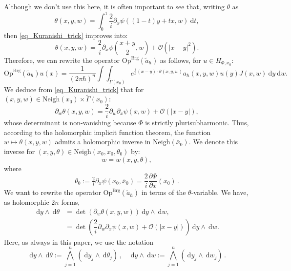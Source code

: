 \documentclass{article}
\newcommand{\Vois}{\mathrm{Neigh}}
\newcommand{\Op}{\mathrm{Op}}
\newcommand{\Brg}{\mathrm{Brg}}
\newcommand{\DD}{\:\!\mathrm{d}}
\newcommand{\intint}{\int\!\!\!\!\int}
\newcommand{\h}{\hbar}
\begin{document}
Although we don't use this here, it is often important to see that,
writing $ \theta$ as
\[
\theta(x, y, w) = \int_0^1 \dfrac{2}{i} \partial_x \psi((1-t)y+ tx, w)
\DD t ,
\]
then \eqref{eq_Kuranishi_trick} improves into:
\[
\theta(x, y, w) = \dfrac{2}{i} \partial_x \psi \left( \dfrac{x+y}{2},
  w \right) + \mathcal{O}( |x-y|^2).
\]
Therefore, we can rewrite the operator
$ \Op^{\Brg}(\tilde a_{ \hbar})$ as follows, for
$u \in H_{ \Phi, x_0}$:
\[
\Op^{\Brg}(\tilde a_{ \hbar}) u(x) = \dfrac{1}{( 2 \pi \hbar)^{n}}
\intint_{\tilde{\Gamma}(x_0)} e^{\frac{i}{\h} (x-y)\cdot\theta(x, y,
  w)} a_{ \hbar}(x, y, w) u(y) J(x, w) \DD y \DD w.
\]
We deduce from \eqref{eq_Kuranishi_trick} that for
$(x, y, w) \in \Vois(x_0) \times \tilde{\Gamma}(x_0)$:
\begin{equation}
  \label{equ:kuranishi-derive}
  \partial_w \theta(x, y, w) =
  \dfrac{2}{i} \partial_w \partial_x \psi(x, w) + \mathcal{O}(|x-y|),
\end{equation}
whose determinant is non-vanishing because $ \Phi$ is strictly
plurisubharmonic. Thus, according to the holomorphic implicit function
theorem, the function $w \mapsto \theta(x, y, w)$ admits a holomorphic
inverse in $ \Vois(\bar{x}_0)$. We denote this inverse for
$(x, y, \theta) \in \Vois(x_0, x_0, \theta_0)$ by:
\begin{equation} \label{eqref:w(x,y,theta)} w = w(x, y, \theta) ,
\end{equation}
where
\[
\theta_0 := \tfrac{2}{i} \partial_x \psi(x_0, \bar{x}_0) =
\dfrac{2}{i} \dfrac{\partial \Phi}{\partial x}(x_0)\,.
\]
We want to rewrite the operator $ \Op^{\Brg}(\tilde a_{ \hbar})$ in
terms of the $ \theta$-variable. We have, as holomorphic $2n$-forms,
\begin{align}
  \DD y \wedge \DD \theta 
  & = \det  \left( \partial_w \theta(x, y, w) \right) \DD y \wedge \DD w, \\
  & = \det \left( \dfrac{2}{i} \partial_w \partial_x \psi(x, w) + \mathcal{O}(|x-y|) \right) \DD y \wedge \DD w .
\end{align}
Here, as always in this paper, we use the notation
\[
\DD y \wedge \DD \theta := \bigwedge_{j=1}^n (\DD y_j \wedge \DD
\theta_j)\,, \quad \DD y \wedge \DD w := \bigwedge_{j=1}^n (\DD y_j
\wedge \DD w_j)\,.
\]
\end{document}
